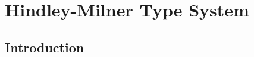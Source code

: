 \documentclass[a4paper,oneside]{memoir}
\begin{document}
\makeatletter
\newcommand{\removelatexerror}{\let\@latex@error\@gobble}
\makeatother

\newcommand{\la}{\leftarrow\xspace}












\newcommand{\inhab}[1]{\op{I}(#1)}

\newcommand{\tord}{\preccurlyeq}
\newcommand{\stord}{\prec}
\newcommand{\ordt}{\tord_\tau}
\newcommand{\tek}{\sim}
\newcommand{\ntek}{\nsim}
\newcommand{\ekt}{\tek_\tau}
\newcommand{\nekt}{\ntek_\tau}
\newcommand{\nsucct}{\nsucc_\tau}

\newcommand{\MGI}[1]{\op{MGI}(#1)}
\newcommand{\MGIt}{\MGI{\tau}}
\newcommand{\It}{\op{I}(\tau)}

\newcommand{\ids}{\sigma_{\op{id}}}

\newcommand{\U}[2]{\op{U}(#1,#2)}
\newcommand{\Utt}{\U{\tau}{\tauPr}}
\newcommand{\MGUtt}{\MGU{\tau}{\tauPr}}

\newcommand{\e}[2]{\op{E}_{#1}(#2)}
\newcommand{\restrict}[2]{{#1}_{\mid #2}}
\newcommand{\fresh}[2]{\op{fresh}_{#1}(#2)}
\newcommand{\newVar}[1]{\op{newVar}(#1)}
\newcommand{\Ss}[1]{\op{ss}(#1)}
\newcommand{\TS}[2]{\op{ts}_{#1}(#2)}
\newcommand{\ts}[2]{\op{ts}_{#1}(#2)}
\newcommand{\TSij}[3]{\op{ts}_{#1,#2}(#3)}
\newcommand{\trees}[2]{\op{trees}_{#1}(#2)}
\newcommand{\FX}{\ap{F}{X}}
\newcommand{\sF}{\s_{F}}
\newcommand{\sX}{\s_{X}}
\newcommand{\vars}[1]{\op{vars}(#1)}
\newcommand{\dom}[1]{\op{dom}(#1)}
\newcommand{\IH}{induction hypothesis\xspace}
\newcommand{\discup}{~\mathbin{\dot{\cup}}~}

\newcommand{\Real}{\mathbb{R}}

\newcommand{\letin}[3]{\texttt{let} \, #1 = #2 \, \texttt{in} \, #3}
\newcommand{\W}{\op{\textbf{W}}}
\newcommand{\Mgu}{\op{\textbf{MGU}}}
\newcommand{\where}{\op{\textbf{where~}}}
\newcommand{\SPr}{S^\prime}


\chapter{Hindley-Milner Type System}





\section{Introduction}
\end{document}
